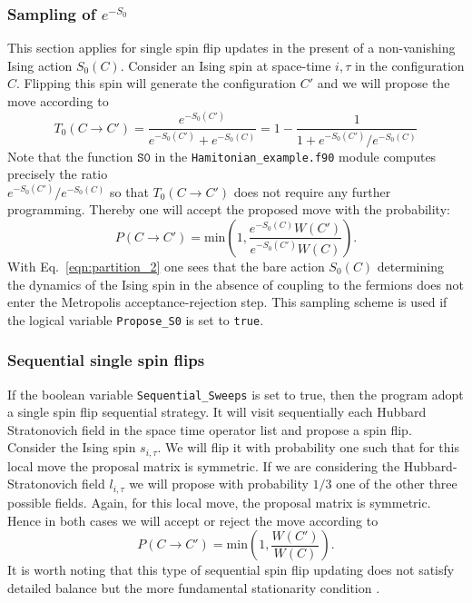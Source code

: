 \subsubsection{Sampling of $e^{-S_0}$}
% 
This section applies for single spin flip updates  in the present of a non-vanishing Ising action $S_0(C)$. 
Consider an Ising spin at space-time $i,\tau$ in the configuration $C$. Flipping this spin will generate the configuration $C'$ and we will propose the move according to 
  \begin{equation}
 T_0(C \rightarrow C')  =  \frac{e^{-S_0(C')}}{ e^{-S_0(C')} + e^{-S_0(C)} }   = 1 - \frac{1}{1 +  e^{-S_0(C')} /e^{-S_0(C)}}
  \end{equation}
 Note that the function $\texttt{S0}$ in the  \texttt{Hamitonian\_example.f90}  module  computes precisely the ratio\\
 ${e^{-S_0(C')} /e^{-S_0(C)}}$ so that  $T_0(C \rightarrow C') $ does not require any further programming. 
 Thereby one will accept  the proposed move with the probability: 
 \begin{equation}
 P(C \rightarrow C') =  \text{min}  \left( 1,  \frac{e^{-S_0(C)}   W(C')}{ e^{-S_0(C')} W(C)} \right).
 \end{equation}
 With Eq.~\ref{eqn:partition_2}  one sees that the bare action $S_0(C)$  determining the  dynamics of the Ising spin  in the absence of coupling to the fermions  does not enter the Metropolis acceptance-rejection step. This sampling scheme is used if the logical variable \texttt{Propose\_S0} is set to \texttt{true}.
% 
\subsubsection{Sequential  single spin flips}
%
If the boolean variable \texttt{Sequential\_Sweeps}  is set to true, then  the program  adopt a single spin flip sequential strategy. It will  visit sequentially each  Hubbard Stratonovich field in the space time operator list and  propose a spin flip. Consider  the Ising spin $s_{i,\tau}$. We will flip it with probability one such that for  this local move  the  proposal matrix is symmetric.  If we are considering the Hubbard-Stratonovich field $l_{i,\tau}$  we will propose with probability $1/3$ one  of the other three  possible fields.   Again, for this local move, the proposal matrix is symmetric.  Hence in both cases we will accept or reject the move according to 
 \begin{equation}
 	P(C \rightarrow C') =  \text{min}  \left( 1, \frac{ W(C')}{W(C)} \right).
 \end{equation}
 It is worth noting that this type of sequential spin flip updating does not satisfy detailed balance but the more fundamental stationarity condition \cite{Sokal89}. 
% 


